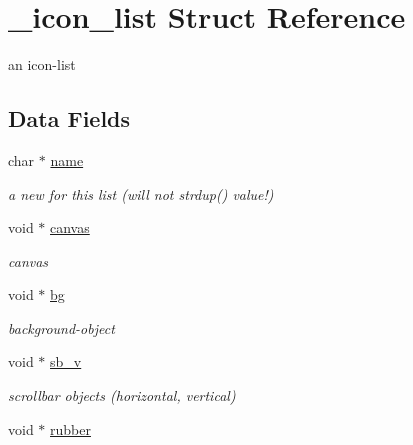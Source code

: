 \hypertarget{struct__icon__list}{
\section{\_\-icon\_\-list Struct Reference}
\label{struct__icon__list}
}
an icon-list  


\subsection*{Data Fields}
\begin{CompactItemize}
\item 
\hypertarget{struct__icon__list_o0}{
char $\ast$ \hyperlink{struct__icon__list_o0}{name}}
\label{struct__icon__list_o0}

\begin{CompactList}\small\item\em a new for this list (will not strdup() value!) \item\end{CompactList}\item 
\hypertarget{struct__icon__list_o1}{
void $\ast$ \hyperlink{struct__icon__list_o1}{canvas}}
\label{struct__icon__list_o1}

\begin{CompactList}\small\item\em canvas \item\end{CompactList}\item 
\hypertarget{struct__icon__list_o2}{
void $\ast$ \hyperlink{struct__icon__list_o2}{bg}}
\label{struct__icon__list_o2}

\begin{CompactList}\small\item\em background-object \item\end{CompactList}\item 
\hypertarget{struct__icon__list_o4}{
void $\ast$ \hyperlink{struct__icon__list_o4}{sb\_\-v}}
\label{struct__icon__list_o4}

\begin{CompactList}\small\item\em scrollbar objects (horizontal, vertical) \item\end{CompactList}\item 
\hypertarget{struct__icon__list_o5}{
void $\ast$ \hyperlink{struct__icon__list_o5}{rubber}}
\label{struct__icon__list_o5}


\end{CompactItemize}
